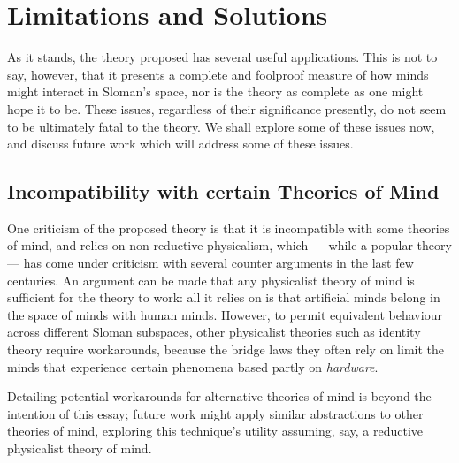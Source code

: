\section{Limitations and Solutions}\label{sec:limitations}
As it stands, the theory proposed has several useful applications. This is not to say, however, that it presents a complete and foolproof measure of how minds might interact in Sloman's space, nor is the theory as complete as one might hope it to be. These issues, regardless of their significance presently, do not seem to be ultimately fatal to the theory. We shall explore some of these issues now, and discuss future work which will address some of these issues.\par

\subsection{Incompatibility with certain Theories of Mind}\label{subsec:incompatibility}
One criticism of the proposed theory is that it is incompatible with some theories of mind, and relies on non-reductive physicalism, which --- while a popular theory --- has come under criticism with several counter arguments in the last few centuries. An argument can be made that any physicalist theory of mind is sufficient for the theory to work: all it relies on is that artificial minds belong in the space of minds with human minds. However, to permit equivalent behaviour across different Sloman subspaces, other physicalist theories such as identity theory require workarounds, because the bridge laws they often rely on limit the minds that experience certain phenomena based partly on \emph{hardware}.\par

Detailing potential workarounds for alternative theories of mind is beyond the intention of this essay; future work might apply similar abstractions to other theories of mind, exploring this technique's utility assuming, say, a reductive physicalist theory of mind.\par

